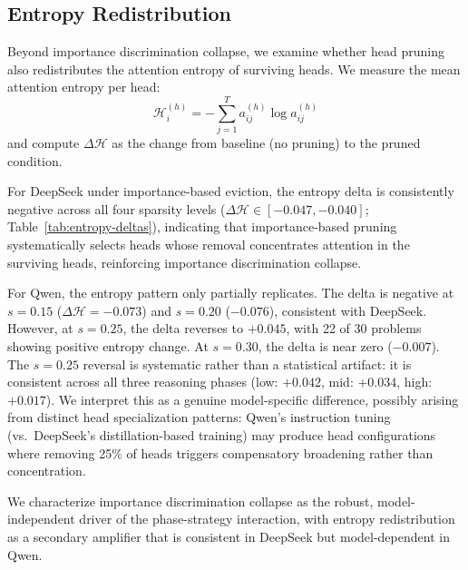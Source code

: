 \subsection{Entropy Redistribution}
\label{sec:entropy-redistribution}

Beyond importance discrimination collapse, we examine whether head pruning also redistributes the attention entropy of surviving heads. We measure the mean attention entropy per head:
\begin{equation}
    \mathcal{H}_i^{(h)} = -\sum_{j=1}^{T} a_{ij}^{(h)} \log a_{ij}^{(h)}
    \label{eq:attn-entropy}
\end{equation}
and compute $\Delta\mathcal{H}$ as the change from baseline (no pruning) to the pruned condition.

For DeepSeek under importance-based eviction, the entropy delta is consistently negative across all four sparsity levels ($\Delta\mathcal{H} \in [-0.047, -0.040]$; Table~\ref{tab:entropy-deltas}), indicating that importance-based pruning systematically selects heads whose removal concentrates attention in the surviving heads, reinforcing importance discrimination collapse.

For Qwen, the entropy pattern only partially replicates. The delta is negative at $s{=}0.15$ ($\Delta\mathcal{H} = -0.073$) and $s{=}0.20$ ($-0.076$), consistent with DeepSeek. However, at $s{=}0.25$, the delta reverses to $+0.045$, with 22 of 30 problems showing positive entropy change. At $s{=}0.30$, the delta is near zero ($-0.007$). The $s{=}0.25$ reversal is systematic rather than a statistical artifact: it is consistent across all three reasoning phases (low: $+0.042$, mid: $+0.034$, high: $+0.017$). We interpret this as a genuine model-specific difference, possibly arising from distinct head specialization patterns: Qwen's instruction tuning (vs.\ DeepSeek's distillation-based training) may produce head configurations where removing 25\% of heads triggers compensatory broadening rather than concentration.

We characterize importance discrimination collapse as the robust, model-independent driver of the phase-strategy interaction, with entropy redistribution as a secondary amplifier that is consistent in DeepSeek but model-dependent in Qwen.

